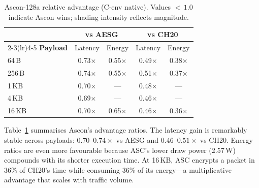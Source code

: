 \begin{table}[t]
\centering
\caption{Ascon-128a relative advantage (C-env native).
  Values ${<}\,1.0$ indicate Ascon wins; shading intensity
  reflects magnitude.}
\label{tab:aead_advantage}
\footnotesize
\setlength{\tabcolsep}{3pt}
\begin{tabular}{@{}l cc cc@{}}
\toprule
 & \multicolumn{2}{c}{\textbf{vs AESG}}
 & \multicolumn{2}{c}{\textbf{vs CH20}} \\
\cmidrule(lr){2-3}\cmidrule(lr){4-5}
\textbf{Payload} & Latency & Energy
                  & Latency & Energy \\
\midrule
64\,B
  & \cellcolor{ptrose!15}0.73$\times$
  & \cellcolor{ptrose!25}0.55$\times$
  & \cellcolor{ptrose!30}0.49$\times$
  & \cellcolor{ptrose!35}0.38$\times$ \\
256\,B
  & \cellcolor{ptrose!15}0.74$\times$
  & \cellcolor{ptrose!25}0.55$\times$
  & \cellcolor{ptrose!30}0.51$\times$
  & \cellcolor{ptrose!35}0.37$\times$ \\
1\,KB
  & \cellcolor{ptrose!18}0.70$\times$
  & ---
  & \cellcolor{ptrose!30}0.48$\times$
  & --- \\
4\,KB
  & \cellcolor{ptrose!20}0.69$\times$
  & ---
  & \cellcolor{ptrose!32}0.46$\times$
  & --- \\
16\,KB
  & \cellcolor{ptrose!20}0.70$\times$
  & \cellcolor{ptrose!18}0.65$\times$
  & \cellcolor{ptrose!32}0.46$\times$
  & \cellcolor{ptrose!35}0.36$\times$ \\
\bottomrule
\end{tabular}
\end{table}

Table~\ref{tab:aead_advantage} summarises Ascon's advantage ratios.
The latency gain is remarkably stable across payloads:
$0.70$--$0.74\times$ vs AESG and $0.46$--$0.51\times$ vs CH20.
Energy ratios are even more favourable because ASC's lower draw power
(2.57\,W) compounds with its shorter execution time.
At 16\,KB, ASC encrypts a packet in 36\% of CH20's time while
consuming 36\% of its energy---a multiplicative advantage that
scales with traffic volume.

